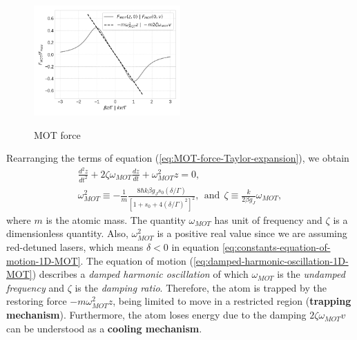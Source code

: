 \begin{figure}[!ht]
	\centering
	\caption{MOT force}
	\includegraphics[width=0.5\textwidth]{USPSC-img/MOT_force.png}
	\label{fig:MOT-force}
\end{figure}

Rearranging the terms of equation (\ref{eq:MOT-force-Taylor-expansion}), we obtain
\begin{gather}
	\frac{d^2 z}{dt^2} + 2\zeta \omega_{MOT} \frac{d z}{d t} + \omega_{MOT}^2 z = 0,
	\label{eq:damped-harmonic-oscillation-1D-MOT}
	\\
	\omega_{MOT}^2 \equiv - \frac{1}{m} \frac{8 \hbar k \beta g_J s_0 (\delta / \Gamma)}{[1 + s_0 + 4(\delta / \Gamma)^2]^2},\ \ \textrm{and}\ \ \zeta \equiv \frac{k}{2\beta g_J} \omega_{MOT},
	\label{eq:constants-equation-of-motion-1D-MOT}
\end{gather}
where $ m $ is the atomic mass. The quantity $ \omega_{MOT} $ has unit of frequency and $ \zeta $ is a dimensionless quantity. Also, $ \omega_{MOT}^2 $ is a positive real value since we are assuming red-detuned lasers, which means $ \delta < 0 $ in equation \ref{eq:constants-equation-of-motion-1D-MOT}. The equation of motion (\ref{eq:damped-harmonic-oscillation-1D-MOT}) describes a \textit{damped harmonic oscillation} of which $ \omega_{MOT} $ is the \textit{undamped frequency} and $ \zeta $ is the \textit{damping ratio}. Therefore, the atom is trapped by the restoring force $ - m \omega_{MOT}^2 z $, being limited to move in a restricted region (\textbf{trapping mechanism}). Furthermore, the atom loses energy due to the damping $ 2 \zeta \omega_{MOT} v $ can be understood as a \textbf{cooling mechanism}.
